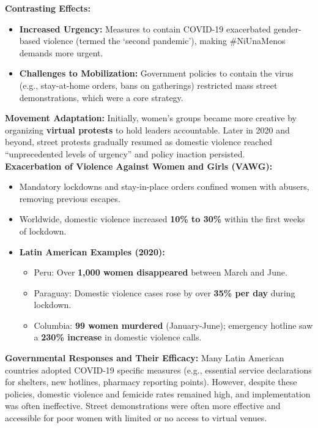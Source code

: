 \documentclass{article}
\begin{document}
    \noindent \textbf{Contrasting Effects:}
    \begin{itemize}
        \item \textbf{Increased Urgency:} Measures to contain COVID-19
        exacerbated gender-based violence (termed the `second pandemic'),
        making \#NiUnaMenos demands more urgent.
        \item \textbf{Challenges to Mobilization:} Government policies to
        contain the virus (e.g., stay-at-home orders, bans on gatherings)
        restricted mass street demonstrations, which were a core strategy.
    \end{itemize}

    \noindent \textbf{Movement Adaptation:} Initially, women's groups became
more creative by organizing \textbf{virtual protests} to hold leaders
accountable. Later in 2020 and beyond, street protests gradually resumed as
domestic violence reached ``unprecedented levels of urgency'' and policy
inaction persisted.\\

    \noindent \textbf{Exacerbation of Violence Against Women and Girls (VAWG):}
    \begin{itemize}
        \item Mandatory lockdowns and stay-in-place orders confined women
        with abusers, removing previous escapes.
        \item Worldwide, domestic violence increased \textbf{10\% to 30\%}
        within the first weeks of lockdown.
        \item \textbf{Latin American Examples (2020):}
        \begin{itemize}
            \item Peru: Over \textbf{1,000 women disappeared} between March
            and June.
            \item Paraguay: Domestic violence cases rose by over
            \textbf{35\% per day} during lockdown.
            \item Columbia: \textbf{99 women murdered} (January-June);
            emergency hotline saw a \textbf{230\% increase} in domestic
            violence calls.
        \end{itemize}
    \end{itemize}

    \noindent \textbf{Governmental Responses and Their Efficacy:} Many Latin
American countries adopted COVID-19 specific measures (e.g., essential
service declarations for shelters, new hotlines, pharmacy reporting points).
However, despite these policies, domestic violence and femicide rates
remained high, and implementation was often ineffective. Street
demonstrations were often more effective and accessible for poor women with
limited or no access to virtual venues.
\end{document}
